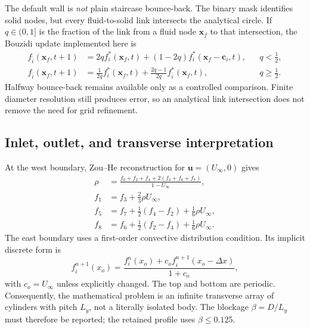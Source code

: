 \documentclass[11pt]{article}
\begin{document}
The default wall is \emph{not} plain staircase bounce-back. The binary mask
identifies solid nodes, but every fluid-to-solid link intersects the analytical
circle. If $q\in(0,1]$ is the fraction of the link from a fluid node $\bm{x}_f$
to that intersection, the Bouzidi update implemented here is
\begin{align}
f_{\bar i}(\bm{x}_f,t+1)
&=2qf_i^*(\bm{x}_f,t)+(1-2q)f_i^*(\bm{x}_f-\bm{c}_i,t),
&&q<\frac12,\\
f_{\bar i}(\bm{x}_f,t+1)
&=\frac{1}{2q}f_i^*(\bm{x}_f,t)
 +\frac{2q-1}{2q}f_{\bar i}^*(\bm{x}_f,t),
&&q\ge\frac12.
\end{align}
Halfway bounce-back remains available only as a controlled comparison. Finite
diameter resolution still produces error, so an analytical link intersection
does not remove the need for grid refinement.

\subsection{Inlet, outlet, and transverse interpretation}
At the west boundary, Zou--He reconstruction for $\bm{u}=(U_\infty,0)$ gives
\begin{align}
\rho&=\frac{f_0+f_2+f_4+2(f_3+f_6+f_7)}{1-U_\infty},\\
f_1&=f_3+\frac23\rho U_\infty,\\
f_5&=f_7+\frac12(f_4-f_2)+\frac16\rho U_\infty,\\
f_8&=f_6+\frac12(f_2-f_4)+\frac16\rho U_\infty.
\end{align}
The east boundary uses a first-order convective distribution condition. Its
implicit discrete form is
\begin{equation}
f_i^{n+1}(x_o)=
\frac{f_i^n(x_o)+c_o f_i^{n+1}(x_o-\Delta x)}{1+c_o},
\end{equation}
with $c_o=U_\infty$ unless explicitly changed. The top and bottom are periodic.
Consequently, the mathematical problem is an infinite transverse array of
cylinders with pitch $L_y$, not a literally isolated body. The blockage
$\beta=D/L_y$ must therefore be reported; the retained profile uses
$\beta\le0.125$.
\end{document}
